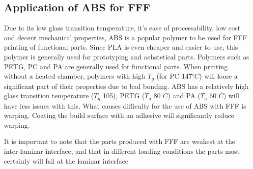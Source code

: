 
\subsection{Application of ABS for FFF}
\label{Application of ABS for FFF}
Due to its low glass transition temperature, it's ease of processability, low cost and decent mechanical properties, ABS is a popular polymer to be used for FFF printing of functional parts. Since PLA is even cheaper and easier to use, this polymer is generally used for prototyping and aehstetical parts. Polymers such as PETG, PC and PA are generally used for functional parts. When printing without a heated chamber, polymers with high $T_g$ (for PC 147$^\circ C$) will loose a significant part of their properties due to bad bonding. ABS has a relatively high glass transition temperature ($T_g$ 105), PETG ($T_g$ 80$^\circ C$) and PA ($T_g$ 60$^\circ C$) will have less issues with this. What causes difficulty for the use of ABS with FFF is warping. Coating the build surface with an adhesive will significantly reduce warping.


It is important to note that the parts produced with FFF are weakest at the inter-laminar interface, and that in different loading conditions the parts most certainly will fail at the laminar interface \cite{Hart2018IncreasedAnnealing} \cite{Popescu2018FDMReview}

